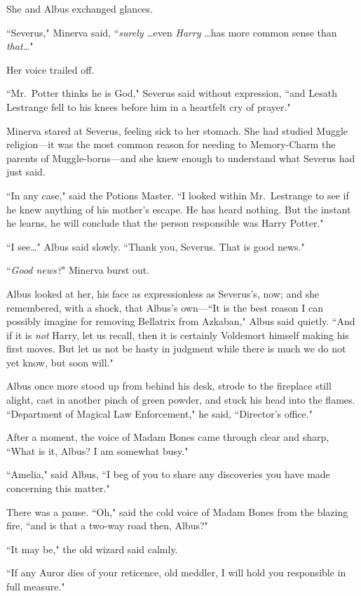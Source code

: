 She and Albus exchanged glances.

``Severus," Minerva said, ``\emph{surely} {\ldots}even \emph{Harry} {\ldots}has more common sense than \emph{that{\ldots}}"

Her voice trailed off.

``Mr.~Potter thinks he is God," Severus said without expression, ``and Lesath Lestrange fell to his knees before him in a heartfelt cry of prayer."

Minerva stared at Severus, feeling sick to her stomach. She had studied Muggle religion—it was the most common reason for needing to Memory-Charm the parents of Muggle-borns—and she knew enough to understand what Severus had just said.

``In any case," said the Potions Master. ``I looked within Mr.~Lestrange to see if he knew anything of his mother's escape. He has heard nothing. But the instant he learns, he will conclude that the person responsible was Harry Potter."

``I see{\ldots}" Albus said slowly. ``Thank you, Severus. That is good news."

``\emph{Good news?}" Minerva burst out.

Albus looked at her, his face as expressionless as Severus's, now; and she remembered, with a shock, that Albus's own—``It is the best reason I can possibly imagine for removing Bellatrix from Azkaban," Albus said quietly. ``And if it is \emph{not} Harry, let us recall, then it is certainly Voldemort himself making his first moves. But let us not be hasty in judgment while there is much we do not yet know, but soon will."

Albus once more stood up from behind his desk, strode to the fireplace still alight, cast in another pinch of green powder, and stuck his head into the flames. ``Department of Magical Law Enforcement," he said, ``Director's office."

After a moment, the voice of Madam Bones came through clear and sharp, ``What is it, Albus? I am somewhat busy."

``Amelia," said Albus, ``I beg of you to share any discoveries you have made concerning this matter."

There was a pause. ``Oh," said the cold voice of Madam Bones from the blazing fire, ``and is that a two-way road then, Albus?"

``It may be," the old wizard said calmly.

``If any Auror dies of your reticence, old meddler, I will hold you responsible in full measure."

